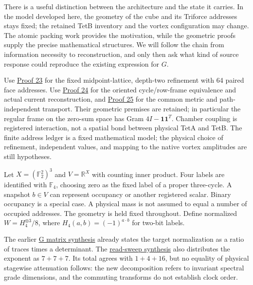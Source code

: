 \documentclass[
  11pt,
]{article}
\begin{document}
There is a useful distinction between the architecture and the state it
carries. In the model developed here, the geometry of the cube and its
Triforce addresses stays fixed; the retained TetB inventory and the
vortex configuration may change. The atomic packing work provides the
motivation, while the geometric proofs supply the precise mathematical
structures. We will follow the chain from information necessity to
reconstruction, and only then ask what kind of source response could
reproduce the existing expression for \(G\).

Use
\href{https://github.com/fielddynamics/research/tree/e2b5cd41c63301abad76d9f1881c518dff9cb732/proofs/recursive-triforce-closure}{Proof
23} for the fixed midpoint-lattice, depth-two refinement with 64 paired
face addresses. Use
\href{https://github.com/fielddynamics/research/tree/e2b5cd41c63301abad76d9f1881c518dff9cb732/proofs/flywheel-tetrad-geometry}{Proof
24} for the oriented cycle/row-frame equivalence and actual current
reconstruction, and
\href{https://github.com/fielddynamics/research/tree/e2b5cd41c63301abad76d9f1881c518dff9cb732/proofs/tetrad-flywheel-convergence}{Proof
25} for the common metric and path-independent transport. Their
geometric premises are retained; in particular the regular frame on the
zero-sum space has Gram \(4I-\mathbf1\mathbf1^T\). Chamber coupling is
registered interaction, not a spatial bond between physical TetA and
TetB. The finite address ledger is a fixed mathematical model; the
physical choice of refinement, independent values, and mapping to the
native vortex amplitudes are still hypotheses.

Let \(X=(\mathbb F_2^2)^3\) and \(V=\mathbb R^X\) with counting inner
product. Four labels are identified with \(\mathbb F_4\), choosing zero
as the fixed label of a proper three-cycle. A snapshot \(b\in V\) can
represent occupancy or another registered scalar. Binary occupancy is a
special case. A physical mass is not assumed to equal a number of
occupied addresses. The geometry is held fixed throughout. Define
normalized \(W=H_4^{\otimes3}/8\), where \(H_4(a,b)=(-1)^{a\cdot b}\)
for two-bit labels.

The earlier
\href{https://github.com/fielddynamics/research/blob/e2b5cd41c63301abad76d9f1881c518dff9cb732/research/g_from_topology/g_matrix_synthesis.md}{G
matrix synthesis} already states the target normalization as a ratio of
traces times a determinant. The
\href{https://github.com/fielddynamics/research/blob/e2b5cd41c63301abad76d9f1881c518dff9cb732/research/g_from_topology/read_sweep_synthesis.md}{read-sweep
synthesis} also distributes the exponent as \(7+7+7\). Its total agrees
with \(1+4+16\), but no equality of physical stagewise attenuation
follows: the new decomposition refers to invariant spectral grade
dimensions, and the commuting transforms do not establish clock order.
\end{document}
